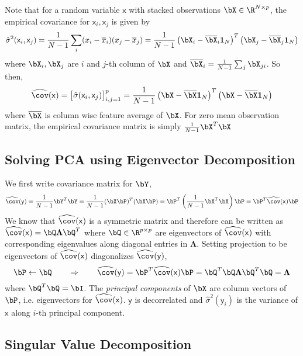 \documentclass[11pt]{article}
\newcommand\ry{\ensuremath{\mathsf{y}}}
\newcommand\rx{\ensuremath{\mathsf{x}}}
\begin{document}
Note that for a random variable $\rx$ with stacked observations $\bX\in\R^{N\times p}$, the empirical covariance for $\rx_i,\rx_j$ is given by 
\[
    \hat{\sigma}^2(\rx_i,\rx_j)
    = \frac{1}{N-1} \sum_i (x_i-\overline{x}_i)(x_j-\overline{x}_j) 
    = \frac{1}{N-1} \left( \bX_i - \overline{\bX}_i \mathbf{1}_N \right)^T \left( \bX_j - \overline{\bX}_j \mathbf{1}_N \right)
\]
where $\bX_i,\bX_j$ are $i$ and $j$-th column of $\bX$ and $\overline{\bX}_i = \frac{1}{N-1} \sum_j \bX_{ji}$. So then,
\[
    \widehat{\cov}(\rx) 
    = \begin{bmatrix}
        \hat{\sigma}(\rx_i,\rx_j)
    \end{bmatrix}_{i,j=1}^p
    = \frac{1}{N-1} \left( \bX - \overline{\bX} \mathbf{1}_N \right)^T \left( \bX - \overline{\bX} \mathbf{1}_N \right)
\]
where $\overline{\bX}$ is column wise feature average of $\bX$. For zero mean observation matrix, the empirical covariance matrix is simply $\frac{1}{N-1} \bX^T \bX$

\subsection{Solving PCA using Eigenvector Decomposition}

We first write covariance matrix for $\bY$,
\[
    \widehat{\cov}(\ry)
    = \frac{1}{N-1} \bY^T \bY
    = \frac{1}{N-1} (\bX\bP)^T (\bX\bP)
    = \bP^T \left( \frac{1}{N-1} \bX^T\bX \right) \bP
    = \bP^T \widehat{\cov}(\rx) \bP
\]
We know that $\widehat{\cov}(\rx)$ is a symmetric matrix and therefore can be written as $\widehat{\cov}(\rx) = \bQ \boldsymbol{\Lambda} \bQ^T$ where $\bQ \in \R^{p\times p}$ are eigenvectors of $\widehat{\cov}(\rx)$ with corresponding eigenvalues along diagonal entries in $\boldsymbol{\Lambda}$. Setting projection to be eigenvectors of $\widehat{\cov}(\rx)$ diagonalizes $\widehat{\cov}(\ry)$,
\[
    \bP \leftarrow \bQ
    \quad\quad \Rightarrow \quad\quad
    \widehat{\cov}(\ry)
    = \bP^T \widehat{\cov}(\rx) \bP
    = \bQ^T \bQ \boldsymbol{\Lambda} \bQ^T \bQ
    = \boldsymbol{\Lambda} 
\]
where $\bQ^T\bQ = \bI$. The \textit{principal components} of $\bX$ are column vectors of $\bP$, i.e. eigenvectors for $\widehat{\cov}(\rx)$. $\ry$ is decorrelated and $\hat{\sigma}^2(\ry_i)$ is the variance of $\rx$ along $i$-th principal component.

\subsection{Singular Value Decomposition}
\end{document}
